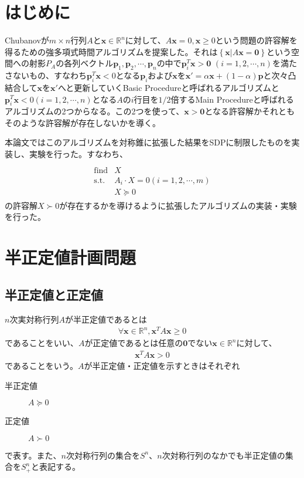 \section{はじめに}
Chubanovが$m \times n$行列$A$と$\mathbf{x} \in \mathbb{R}^n$に対して、$A \mathbf{x} = 0, \mathbf{x} \geq 0$という問題の許容解を得るための強多項式時間アルゴリズムを提案した。それは$\left\{\mathbf{x} | A \mathbf{x} = \mathbf{0}\right\}$という空間への射影$P_A$の各列ベクトル$\mathbf{p}_1, \mathbf{p}_2, \cdots, \mathbf{p}_n$の中で$\mathbf{p}_i^T \mathbf{x} > \mathbf{0} \,\, (i = 1, 2, \cdots, n)$を満たさないもの、すなわち$\mathbf{p}_i^T \mathbf{x} < 0$となる$\mathbf{p}_i$および$\mathbf{x}$を$\mathbf{x}' = \alpha \mathbf{x} + (1 - \alpha) \mathbf{p}$と次々凸結合して$\mathbf{x}$を$\mathbf{x}'$へと更新していくBasic Procedureと呼ばれるアルゴリズムと$\mathbf{p}_i^T \mathbf{x} < 0 (i = 1, 2, \cdots, n)$となる$A$の$i$行目を$1 / 2$倍するMain Procedureと呼ばれるアルゴリズムの2つからなる。この2つを使って、$\mathbf{x} > \mathbf{0}$となる許容解かそれともそのような許容解が存在しないかを導く。

本論文ではこのアルゴリズムを対称錐に拡張した結果をSDPに制限したものを実装し、実験を行った。すなわち、
\begin{align*}
  \begin{array}{ll} \\
    \text{find} & X \\
    \text{s.t.} & A_i \cdot X = 0 (i = 1, 2, \cdots, m) \\
                & X \succeq 0
  \end{array}
\end{align*}
の許容解$X \succ 0$が存在するかを導けるように拡張したアルゴリズムの実装・実験を行った。


\section{半正定値計画問題}
\subsection{半正定値と正定値}
$n$次実対称行列$A$が半正定値であるとは
\begin{align} \label{PSD}
  \forall \mathbf{x} \in \mathbb{R}^n, \mathbf{x}^T A \mathbf{x} \geq 0
\end{align}
であることをいい、$A$が正定値であるとは任意の$\mathbf{0}$でない$\mathbf{x} \in \mathbb{R}^n$に対して、
\begin{align} \label{PD}
  \mathbf{x}^T A \mathbf{x} > 0
\end{align}
であることをいう。$A$が半正定値・正定値を示すときはそれぞれ
\begin{description}
  \item[半正定値] $A \succeq 0$
  \item[正定値]   $A \succ 0$
\end{description}
で表す。また、$n$次対称行列の集合を$S^n$、$n$次対称行列のなかでも半正定値の集合を$S_+^n$と表記する。

